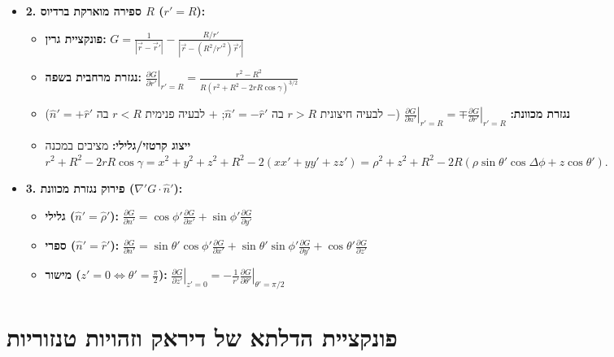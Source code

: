 \documentclass[10pt,a4paper]{article}
\begin{document}
\begin{multicols*}{2}
\begin{itemize}[leftmargin=*]
    \item \textbf{2. ספירה מוארקת ברדיוס $R$ ($r'=R$):}
    \begin{itemize}
        \item \textbf{פונקציית גרין:} $G = \frac{1}{|\vec{r}-\vec{r}'|} - \frac{R/r'}{\left|\vec{r} - (R^2/r'^2)\vec{r}'\right|}$
        \item \textbf{נגזרת מרחבית בשפה:} $\left.\frac{\partial G}{\partial r'}\right|_{r'=R} = \frac{r^2 - R^2}{R\left(r^2 + R^2 - 2rR\cos\gamma\right)^{3/2}}$
        \item \textbf{נגזרת מכוונת:} $\left.\frac{\partial G}{\partial n'}\right|_{r'=R} = \mp \left.\frac{\partial G}{\partial r'}\right|_{r'=R}$ \quad ($-$ לבעיה חיצונית $r>R$ בה $\hat{n}'=-\hat{r}'$; $+$ לבעיה פנימית $r<R$ בה $\hat{n}'=+\hat{r}'$)
        \item \textbf{ייצוג קרטזי/גלילי:} מציבים במכנה $r^2+R^2-2rR\cos\gamma = x^2+y^2+z^2+R^2-2(xx'+yy'+zz') = \rho^2+z^2+R^2-2R(\rho\sin\theta'\cos\Delta\phi + z\cos\theta')$.
    \end{itemize}

    \item \textbf{3. פירוק נגזרת מכוונת ($\nabla' G \cdot \hat{n}'$):}
    \begin{itemize}
        \item \textbf{גלילי ($\hat{n}'=\hat{\rho}'$):} $\frac{\partial G}{\partial n'} = \cos\phi' \frac{\partial G}{\partial x'} + \sin\phi' \frac{\partial G}{\partial y'}$
        \item \textbf{ספרי ($\hat{n}'=\hat{r}'$):} $\frac{\partial G}{\partial n'} = \sin\theta'\cos\phi' \frac{\partial G}{\partial x'} + \sin\theta'\sin\phi' \frac{\partial G}{\partial y'} + \cos\theta' \frac{\partial G}{\partial z'}$
        \item \textbf{מישור ($z'=0 \iff \theta'=\frac{\pi}{2}$):} $\left.\frac{\partial G}{\partial z'}\right|_{z'=0} = -\frac{1}{r'}\left.\frac{\partial G}{\partial \theta'}\right|_{\theta'=\pi/2}$
    \end{itemize}

\end{itemize}

\section{פונקציית הדלתא של דיראק וזהויות טנזוריות}

\begin{itemize}[leftmargin=*]


\end{itemize}
\end{multicols*}
\end{document}
